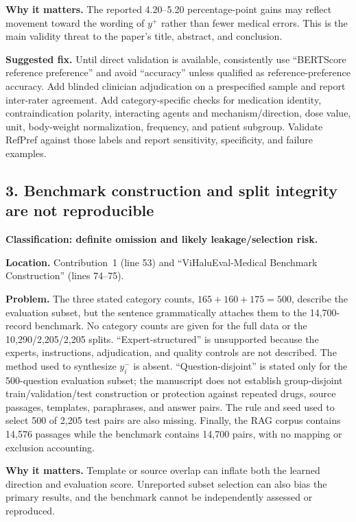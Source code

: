 \documentclass[11pt]{article}
\newcommand{\status}[1]{\textbf{#1}}
\begin{document}
\status{Why it matters.} The reported 4.20--5.20 percentage-point gains may reflect movement toward the wording of $y^+$ rather than fewer medical errors.  This is the main validity threat to the paper's title, abstract, and conclusion.

\status{Suggested fix.} Until direct validation is available, consistently use ``BERTScore reference preference'' and avoid ``accuracy'' unless qualified as reference-preference accuracy.  Add blinded clinician adjudication on a prespecified sample and report inter-rater agreement.  Add category-specific checks for medication identity, contraindication polarity, interacting agents and mechanism/direction, dose value, unit, body-weight normalization, frequency, and patient subgroup.  Validate RefPref against those labels and report sensitivity, specificity, and failure examples.

\subsection*{3. Benchmark construction and split integrity are not reproducible}

\status{Classification: definite omission and likely leakage/selection risk.}

\status{Location.} Contribution~1 (line 53) and ``ViHaluEval-Medical Benchmark Construction'' (lines 74--75).

\status{Problem.} The three stated category counts, $165+160+175=500$, describe the evaluation subset, but the sentence grammatically attaches them to the 14,700-record benchmark.  No category counts are given for the full data or the 10,290/2,205/2,205 splits.  ``Expert-structured'' is unsupported because the experts, instructions, adjudication, and quality controls are not described.  The method used to synthesize $y_i^-$ is absent.  ``Question-disjoint'' is stated only for the 500-question evaluation subset; the manuscript does not establish group-disjoint train/validation/test construction or protection against repeated drugs, source passages, templates, paraphrases, and answer pairs.  The rule and seed used to select 500 of 2,205 test pairs are also missing.  Finally, the RAG corpus contains 14,576 passages while the benchmark contains 14,700 pairs, with no mapping or exclusion accounting.

\status{Why it matters.} Template or source overlap can inflate both the learned direction and evaluation score.  Unreported subset selection can also bias the primary results, and the benchmark cannot be independently assessed or reproduced.
\end{document}
